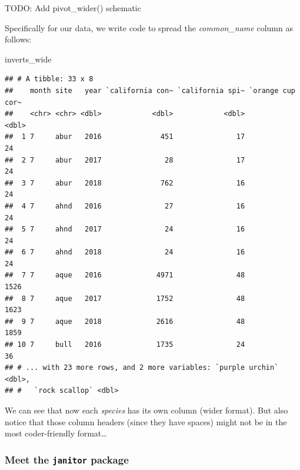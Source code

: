 \documentclass[]{book}
\newenvironment{Shaded}{\begin{snugshade}}{\end{snugshade}}
\newcommand{\DataTypeTok}[1]{\textcolor[rgb]{0.13,0.29,0.53}{#1}}
\newcommand{\KeywordTok}[1]{\textcolor[rgb]{0.13,0.29,0.53}{\textbf{#1}}}
\newcommand{\NormalTok}[1]{#1}
\newcommand{\OperatorTok}[1]{\textcolor[rgb]{0.81,0.36,0.00}{\textbf{#1}}}
\newcommand{\StringTok}[1]{\textcolor[rgb]{0.31,0.60,0.02}{#1}}
\begin{document}
TODO: Add pivot\_wider() schematic

Specifically for our data, we write code to spread the \emph{common\_name} column as follows:

\begin{Shaded}
\end{Shaded}

\begin{Shaded}
\begin{Highlighting}[]
\NormalTok{inverts_wide}
\end{Highlighting}
\end{Shaded}

\begin{verbatim}
## # A tibble: 33 x 8
##    month site   year `california con~ `california spi~ `orange cup cor~
##    <chr> <chr> <dbl>            <dbl>            <dbl>            <dbl>
##  1 7     abur   2016              451               17               24
##  2 7     abur   2017               28               17               24
##  3 7     abur   2018              762               16               24
##  4 7     ahnd   2016               27               16               24
##  5 7     ahnd   2017               24               16               24
##  6 7     ahnd   2018               24               16               24
##  7 7     aque   2016             4971               48             1526
##  8 7     aque   2017             1752               48             1623
##  9 7     aque   2018             2616               48             1859
## 10 7     bull   2016             1735               24               36
## # ... with 23 more rows, and 2 more variables: `purple urchin` <dbl>,
## #   `rock scallop` <dbl>
\end{verbatim}

We can see that now each \emph{species} has its own column (wider format). But also notice that those column headers (since they have spaces) might not be in the most coder-friendly format\ldots{}

\hypertarget{meet-the-janitor-package}{%
\subsubsection{\texorpdfstring{Meet the \texttt{janitor} package}{Meet the janitor package}}\label{meet-the-janitor-package}}
\end{document}

